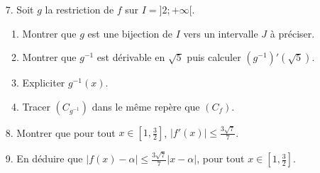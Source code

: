 \documentclass[12pt]{article}
\begin{document}
\begin{enumerate}
\begin{enumerate}
    \end{enumerate}
    \item[7.] Soit $g$ la restriction de $f$ sur $I = ]2; +\infty[$.
    \begin{enumerate}
        \item Montrer que $g$ est une bijection de $I$ vers un intervalle $J$ à préciser.
        \item Montrer que $g^{-1}$ est dérivable en $\sqrt{5}$ puis calculer $(g^{-1})'(\sqrt{5})$.
        \item Expliciter $g^{-1}(x)$.
        \item Tracer $(C_{g^{-1}})$ dans le même repère que $(C_f)$.
    \end{enumerate}
    \item[8.] Montrer que pour tout $x \in \left[ 1, \frac{3}{2} \right]$, $|f'(x)| \leq \frac{3\sqrt{7}}{7}$.
    \item[9.] En déduire que $|f(x) - \alpha| \leq \frac{3\sqrt{7}}{7} |x - \alpha|$, pour tout $x \in \left[ 1, \frac{3}{2} \right]$.
\end{enumerate}
\end{document}
